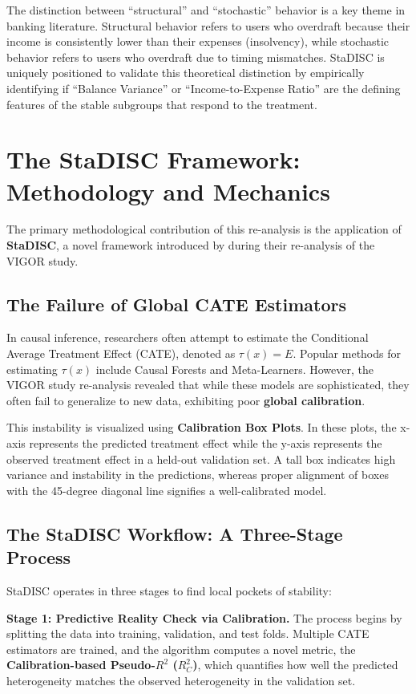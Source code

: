 \documentclass[11pt,a4paper]{article}
\begin{document}
	The distinction between ``structural'' and ``stochastic'' behavior is a key theme in banking literature. Structural behavior refers to users who overdraft because their income is consistently lower than their expenses (insolvency), while stochastic behavior refers to users who overdraft due to timing mismatches. StaDISC is uniquely positioned to validate this theoretical distinction by empirically identifying if ``Balance Variance'' or ``Income-to-Expense Ratio'' are the defining features of the stable subgroups that respond to the treatment.
	
	\section{The StaDISC Framework: Methodology and Mechanics}
	The primary methodological contribution of this re-analysis is the application of \textbf{StaDISC}, a novel framework introduced by \citet{dwivedi2020} during their re-analysis of the VIGOR study.
	
	\subsection{The Failure of Global CATE Estimators}
	In causal inference, researchers often attempt to estimate the Conditional Average Treatment Effect (CATE), denoted as $\tau(x) = E$. Popular methods for estimating $\tau(x)$ include Causal Forests and Meta-Learners. However, the VIGOR study re-analysis revealed that while these models are sophisticated, they often fail to generalize to new data, exhibiting poor \textbf{global calibration}.
	
	This instability is visualized using \textbf{Calibration Box Plots}. In these plots, the x-axis represents the predicted treatment effect while the y-axis represents the observed treatment effect in a held-out validation set. A tall box indicates high variance and instability in the predictions, whereas proper alignment of boxes with the 45-degree diagonal line signifies a well-calibrated model.
	
	\subsection{The StaDISC Workflow: A Three-Stage Process}
	StaDISC operates in three stages to find local pockets of stability:
	
	\textbf{Stage 1: Predictive Reality Check via Calibration.} The process begins by splitting the data into training, validation, and test folds. Multiple CATE estimators are trained, and the algorithm computes a novel metric, the \textbf{Calibration-based Pseudo-$R^2$ ($R^2_C$)}, which quantifies how well the predicted heterogeneity matches the observed heterogeneity in the validation set.
	
\end{document}
